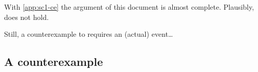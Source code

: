 \begin{note}
  With \autoref{app:sc1-ce} the argument of this document is almost complete.
  Plausibly, \issueInclusion{} does not hold.

  Still, a counterexample to \issueInclusion{} requires an (actual) event\dots
\end{note}





\subsection{A counterexample}
\label{sec:counterexample}



